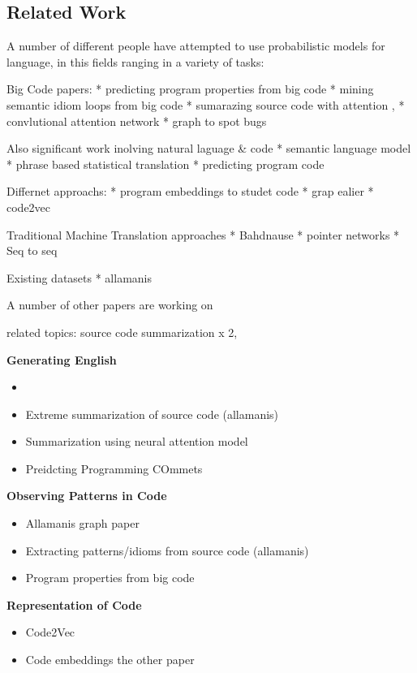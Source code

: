 \subsection{Related Work} %
\label{ssub:related work}

A number of different people have attempted to use probabilistic models for language, in this fields ranging in a variety of tasks:

Big Code papers:
* predicting program properties from big code
* mining semantic idiom loops from big code
* sumarazing source code with attention ,
* convlutional attention network
* graph to spot bugs

Also significant work inolving natural laguage \& code
* semantic language model
* phrase based statistical translation
* predicting program code

Differnet approachs:
* program embeddings to studet code
* grap ealier
* code2vec

Traditional Machine Translation approaches
* Bahdnause
* pointer networks
* Seq to seq

Existing datasets
* allamanis


A number of other papers are working on 


related topics: source code summarization x 2, 

\textbf{Generating English}
\begin{itemize}
    \item 
    \item Extreme summarization of source code (allamanis)
    \item Summarization using neural attention model
    \item Preidcting Programming COmmets
\end{itemize}

\textbf{Observing Patterns in Code}
\begin{itemize}
    \item Allamanis graph paper
    \item Extracting patterns/idioms from source code (allamanis)
    \item Program properties from big code
\end{itemize}

\textbf{Representation of Code}
\begin{itemize}
    \item Code2Vec
    \item Code embeddings the other paper
\end{itemize}

